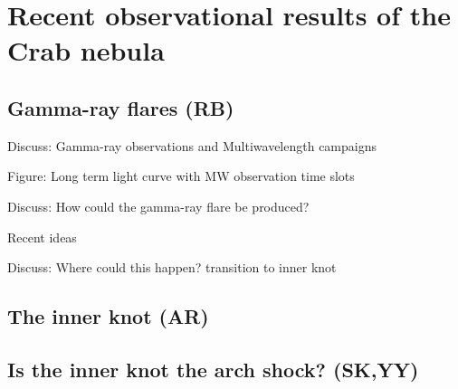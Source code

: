 \section{Recent observational results of the Crab nebula}
\subsection{Gamma-ray flares (RB)}
Discuss: Gamma-ray observations and Multiwavelength campaigns

Figure: Long term light curve with MW observation time slots

Discuss: How could the gamma-ray flare be produced?

Recent ideas  \cite{2016arXiv160403179Y}\cite{2015arXiv151205426Z}\cite{2016arXiv160304850N}\cite{2016arXiv160305731L}

Discuss: Where could this happen? transition to inner knot

\subsection{The inner knot   (AR)}
\subsection{Is the inner knot the arch shock?                                      (SK,YY)}
